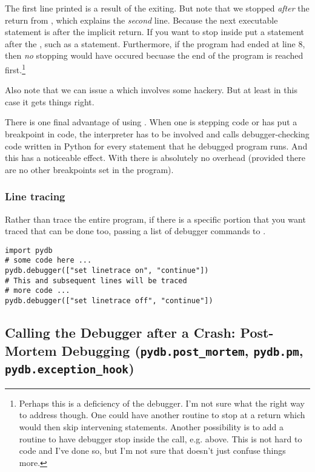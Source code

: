 The first  line printed is a result of the
 exiting. But note that we stopped \emph{after\/} the
return from , which explains the \emph{second\/}
 line. Because the next executable statement is after
the implicit return. If you want to stop inside  put a
statement after the , such as a 
statement. Furthermore, if the program had ended at line 8, then
\emph{no\/} stopping would have occured becuase the end of the program
is reached first.\footnote{Perhaps this is a deficiency of the
debugger. I'm not sure what the right way to address though. One could
have another routine to stop at a return which would then skip
intervening statements. Another possibility is to add a routine to
have debugger stop inside the call, e.g.  above. This
is not hard to code and I've done so, but I'm not sure that doesn't
just confuse things more.}

Also note that we can issue a  which involves some
hackery. But at least in this case it gets things right.

There is one final advantage of using .  When one is
stepping code or has put a breakpoint in code, the interpreter has to
be involved and calls debugger-checking code written in Python for
every statement that he debugged program runs. And this has a
noticeable effect. With  there is absolutely no
overhead (provided there are no other breakpoints set in the program).

\subsubsection{Line tracing}\label{subsubsection-linetracing}
Rather than trace the entire program, if there is a specific portion
that you want traced that can be done too, passing a list of debugger
commands to .

\begin{verbatim}
import pydb 
# some code here ...
pydb.debugger(["set linetrace on", "continue"])
# This and subsequent lines will be traced
# more code ...
pydb.debugger(["set linetrace off", "continue"])
\end{verbatim}

\subsection{Calling the Debugger after a Crash: Post-Mortem
  Debugging ({\tt pydb.post_mortem}, {\tt pydb.pm}, {\tt pydb.exception_hook})}\label{subsection-post-mortem}

